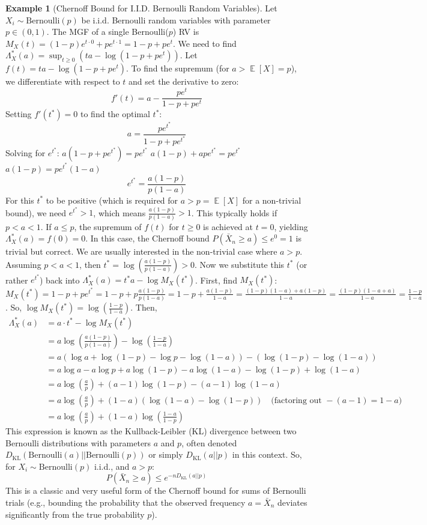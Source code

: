 \documentclass[11pt, letterpaper]{article}
\theoremstyle{plain} %
\theoremstyle{definition} %
\newtheorem{example}[theorem]{Example}
\theoremstyle{remark} %
\DeclareMathOperator{\E}{\mathbb{E}}
\newcommand{\DKL}{D_{\mathrm{KL}}} %
\newcommand{\Bern}{\mathrm{Bernoulli}}
\begin{document}
\begin{example}[Chernoff Bound for I.I.D. Bernoulli Random Variables]
\label{ex:chernoff_bernoulli}
Let $X_i \sim \Bern(p)$ be i.i.d. Bernoulli random variables with parameter $p \in (0,1)$.
The MGF of a single Bernoulli($p$) RV is $M_X(t) = (1-p)e^{t \cdot 0} + p e^{t \cdot 1} = 1-p+pe^t$.
We need to find $\Lambda_X^*(a) = \sup_{t \ge 0} (ta - \log(1-p+pe^t))$.
Let $f(t) = ta - \log(1-p+pe^t)$. To find the supremum (for $a > \E[X]=p$), we differentiate with respect to $t$ and set the derivative to zero:
\[ f'(t) = a - \frac{pe^t}{1-p+pe^t} \]
Setting $f'(t^*)=0$ to find the optimal $t^*$:
\[ a = \frac{pe^{t^*}}{1-p+pe^{t^*}} \]
Solving for $e^{t^*}$:
$a(1-p+pe^{t^*}) = pe^{t^*}$
$a(1-p) + ape^{t^*} = pe^{t^*}$
$a(1-p) = pe^{t^*}(1-a)$
\[ e^{t^*} = \frac{a(1-p)}{p(1-a)} \]
For this $t^*$ to be positive (which is required for $a > p = \E[X]$ for a non-trivial bound), we need $e^{t^*} > 1$, which means $\frac{a(1-p)}{p(1-a)} > 1$. This typically holds if $p < a < 1$.
If $a \le p$, the supremum of $f(t)$ for $t \ge 0$ is achieved at $t=0$, yielding $\Lambda_X^*(a)=f(0)=0$. In this case, the Chernoff bound $P(\bar{X}_n \ge a) \le e^0 = 1$ is trivial but correct.
We are usually interested in the non-trivial case where $a > p$. Assuming $p < a < 1$, then $t^* = \log\left(\frac{a(1-p)}{p(1-a)}\right) > 0$.
Now we substitute this $t^*$ (or rather $e^{t^*}$) back into $\Lambda_X^*(a) = t^*a - \log M_X(t^*)$.
First, find $M_X(t^*)$:
$M_X(t^*) = 1-p+pe^{t^*} = 1-p+p\frac{a(1-p)}{p(1-a)} = 1-p+\frac{a(1-p)}{1-a} = \frac{(1-p)(1-a)+a(1-p)}{1-a} = \frac{(1-p)(1-a+a)}{1-a} = \frac{1-p}{1-a}$.
So, $\log M_X(t^*) = \log\left(\frac{1-p}{1-a}\right)$.
Then,
\begin{align*}
\Lambda_X^*(a) &= a \cdot t^* - \log M_X(t^*) \\
&= a \log\left(\frac{a(1-p)}{p(1-a)}\right) - \log\left(\frac{1-p}{1-a}\right) \\
&= a \left( \log a + \log(1-p) - \log p - \log(1-a) \right) - \left( \log(1-p) - \log(1-a) \right) \\
&= a \log a - a \log p + a \log(1-p) - a \log(1-a) - \log(1-p) + \log(1-a) \\
&= a \log\left(\frac{a}{p}\right) + (a-1) \log(1-p) - (a-1)\log(1-a) \\
&= a \log\left(\frac{a}{p}\right) + (1-a) \left( \log(1-a) - \log(1-p) \right) \quad \text{(factoring out } -(a-1) = 1-a \text{)} \\
&= a \log\left(\frac{a}{p}\right) + (1-a) \log\left(\frac{1-a}{1-p}\right)
\end{align*}
This expression is known as the Kullback-Leibler (KL) divergence between two Bernoulli distributions with parameters $a$ and $p$, often denoted $\DKL(\Bern(a) || \Bern(p))$ or simply $\DKL(a || p)$ in this context.
So, for $X_i \sim \Bern(p)$ i.i.d., and $a > p$:
\[ P(\bar{X}_n \ge a) \le e^{-n \DKL(a || p)} \]
This is a classic and very useful form of the Chernoff bound for sums of Bernoulli trials (e.g., bounding the probability that the observed frequency $a = \bar{X}_n$ deviates significantly from the true probability $p$).
\end{example}
\end{document}
